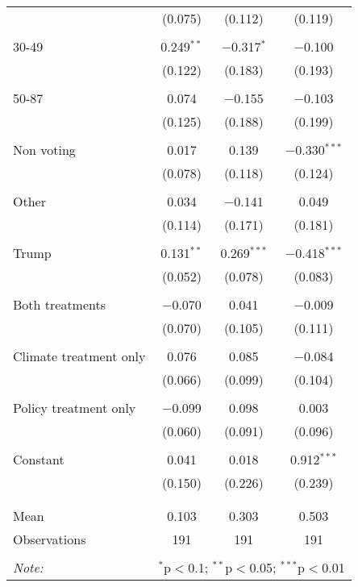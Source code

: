 \begin{tabular}{@{\extracolsep{5pt}}lccc}
  & (0.075) & (0.112) & (0.119) \\ 
  & & & \\ 
 30-49 & 0.249$^{**}$ & $-$0.317$^{*}$ & $-$0.100 \\ 
  & (0.122) & (0.183) & (0.193) \\ 
  & & & \\ 
 50-87 & 0.074 & $-$0.155 & $-$0.103 \\ 
  & (0.125) & (0.188) & (0.199) \\ 
  & & & \\ 
 Non voting & 0.017 & 0.139 & $-$0.330$^{***}$ \\ 
  & (0.078) & (0.118) & (0.124) \\ 
  & & & \\ 
 Other & 0.034 & $-$0.141 & 0.049 \\ 
  & (0.114) & (0.171) & (0.181) \\ 
  & & & \\ 
 Trump & 0.131$^{**}$ & 0.269$^{***}$ & $-$0.418$^{***}$ \\ 
  & (0.052) & (0.078) & (0.083) \\ 
  & & & \\ 
 Both treatments & $-$0.070 & 0.041 & $-$0.009 \\ 
  & (0.070) & (0.105) & (0.111) \\ 
  & & & \\ 
 Climate treatment only & 0.076 & 0.085 & $-$0.084 \\ 
  & (0.066) & (0.099) & (0.104) \\ 
  & & & \\ 
 Policy treatment only & $-$0.099 & 0.098 & 0.003 \\ 
  & (0.060) & (0.091) & (0.096) \\ 
  & & & \\ 
 Constant & 0.041 & 0.018 & 0.912$^{***}$ \\ 
  & (0.150) & (0.226) & (0.239) \\ 
  & & & \\ 
\hline \\[-1.8ex] 
Mean & 0.103 & 0.303 & 0.503 \\ 
Observations & 191 & 191 & 191 \\ 
\hline 
\hline \\[-1.8ex] 
\textit{Note:}  & \multicolumn{3}{r}{$^{*}$p$<$0.1; $^{**}$p$<$0.05; $^{***}$p$<$0.01} \\ 
\end{tabular} 
